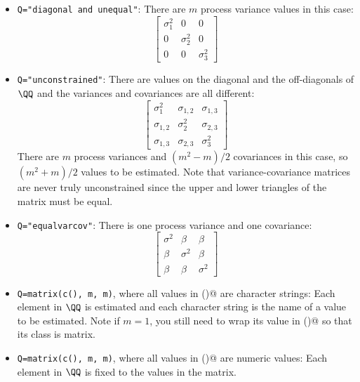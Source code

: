 \begin{itemize}
\item[] \texttt{Q="diagonal and unequal"}:  There are $m$ process variance values in this case:  
\begin{equation*}
 \left[ \begin{array}{ccc}
    \sigma^2_1 & 0 & 0\\
    0 & \sigma^2_2 & 0 \\
    0 & 0 & \sigma^2_3 \end{array} \right]
\end{equation*}

\item[] \texttt{Q="unconstrained"}: There are values on the diagonal and the off-diagonals of $\QQ$ and the variances and covariances are all different:  
\begin{equation*}
 \left[ \begin{array}{ccc}
    \sigma^2_1 & \sigma_{1,2} & \sigma_{1,3}\\
    \sigma_{1,2} & \sigma^2_2 & \sigma_{2,3} \\
    \sigma_{1,3} & \sigma_{2,3} & \sigma^2_3 \end{array} \right]
\end{equation*}
There are $m$ process variances and $(m^2-m)/2$ covariances in this case, so $(m^2+m)/2$ values to be estimated.  Note that variance-covariance matrices are never truly unconstrained since the upper and lower triangles of the matrix must be equal.

\item[] \texttt{Q="equalvarcov"}: There is one process variance and one covariance:
\begin{equation*}
 \left[ \begin{array}{ccc}
    \sigma^2 & \beta & \beta\\
    \beta & \sigma^2 & \beta \\
    \beta & \beta & \sigma^2 \end{array} \right]
\end{equation*}

\item[] \texttt{Q=matrix(c(), m, m)}, where all values in \verb@c()@ are character strings:  Each element in $\QQ$ is estimated and each character string is the name of a value to be estimated. Note if $m=1$, you still need to wrap its value in \verb@matrix()@ so that its class is matrix.  

\item[] \texttt{Q=matrix(c(), m, m)}, where all values in \verb@c()@ are numeric values:  Each element in $\QQ$ is fixed to the values in the matrix. 


\end{itemize}
